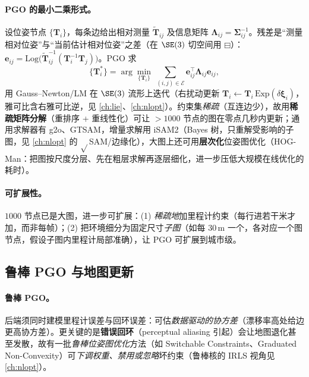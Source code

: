\paragraph{PGO 的最小二乘形式。}
设位姿节点 $\{\mathbf{T}_i\}$，每条边给出相对测量 $\tilde{\mathbf{T}}_{ij}$ 及信息矩阵 $\boldsymbol{\Lambda}_{ij}=\boldsymbol{\Sigma}_{ij}^{-1}$。残差是“测量相对位姿”与“当前估计相对位姿”之差（在 $\SE(3)$ 切空间用 $\boxminus$）：$\mathbf{e}_{ij}=\mathrm{Log}\big(\tilde{\mathbf{T}}_{ij}^{-1}(\mathbf{T}_i^{-1}\mathbf{T}_j)\big)$。PGO 求
\begin{equation}
  \{\mathbf{T}_i^*\}=\arg\min_{\{\mathbf{T}_i\}}\ \sum_{(i,j)\in\mathcal{E}}\mathbf{e}_{ij}^\top\boldsymbol{\Lambda}_{ij}\mathbf{e}_{ij},
  \label{eq:lidar-pgo}
\end{equation}
用 Gauss–Newton/LM 在 $\SE(3)$ 流形上迭代（右扰动更新 $\mathbf{T}_i\leftarrow\mathbf{T}_i\,\mathrm{Exp}(\delta\boldsymbol{\xi}_i)$，雅可比含右雅可比逆，见 \cref{ch:lie}、\cref{ch:nlopt}）。约束集\emph{稀疏}（互连边少），故用\textbf{稀疏矩阵分解}（重排序 + 重线性化）可让 $>1000$ 节点的图在零点几秒内更新\cite{carlone2026handbook}；通用求解器有 g2o、GTSAM\cite{dellaert2017factor}，增量求解用 iSAM2\cite{kaess2012isam2}（Bayes 树，只重解受影响的子图，见 \cref{ch:nlopt} 的 $\sqrt{}$SAM/边缘化），大图上还可用\textbf{层次化}位姿图优化（HOG-Man\cite{carlone2026handbook}：把图按尺度分层、先在粗层求解再逐层细化，进一步压低大规模在线优化的耗时）。

\paragraph{可扩展性。}
$1000$ 节点已是大图，进一步可扩展\cite{carlone2026handbook}：(1) \emph{稀疏地}加里程计约束（每行进若干米才加，而非每帧）；(2) 把环境细分为固定尺寸\emph{子图}（如每 $30$\,m 一个，各对应一个图节点，假设子图内里程计局部准确），让 PGO 可扩展到城市级。

\subsection{鲁棒 PGO 与地图更新}
\label{sec:lidar-robust-pgo}

\paragraph{鲁棒 PGO。}
后端须同时建模里程计误差与回环误差\cite{carlone2026handbook}：可估\emph{数据驱动的协方差}（漂移率高处给边更高协方差）。更关键的是\textbf{错误回环}（perceptual aliasing 引起）会让地图退化甚至发散，故有一批\emph{鲁棒位姿图优化}方法（如 Switchable Constraints\cite{sunderhauf2012switchable}、Graduated Non-Convexity\cite{yang2020gnc}）可\emph{下调权重、禁用或忽略}坏约束（鲁棒核的 IRLS 视角见 \cref{ch:nlopt}）。

